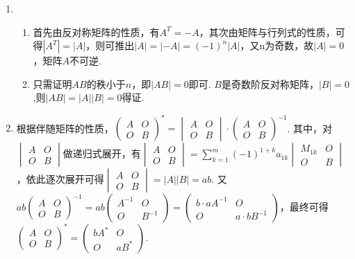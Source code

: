 \begin{enumerate}
    \item \begin{enumerate}
              \item 首先由反对称矩阵的性质，有$A^T=-A$，其次由矩阵与行列式的性质，可得$|A^T|=|A|$，则可推出$|A|=|-A|=(-1)^n|A|$，又n为奇数，故$|A|=0$，矩阵$A$不可逆.

              \item 只需证明$AB$的秩小于$n$，即$|AB|=0$即可. $B$是奇数阶反对称矩阵，$|B|=0$,则$|AB|=|A||B|=0$得证.
          \end{enumerate}

    \item 根据伴随矩阵的性质，$\begin{pmatrix}
                  A & O \\ O & B
              \end{pmatrix}^* = \begin{vmatrix}
                  A & O \\ O & B
              \end{vmatrix} \cdot \begin{pmatrix}
                  A & O \\ O & B
              \end{pmatrix}^{-1}$. 其中，对$\begin{vmatrix}
                  A & O \\ O & B
              \end{vmatrix}$做递归式展开，有$\begin{vmatrix}
                  A & O \\ O & B
              \end{vmatrix}=\displaystyle\sum_{k=1}^{m}(-1)^{1+k}a_{1k}\begin{vmatrix}
                  M_{1k} & O \\ O & B
              \end{vmatrix}$，依此逐次展开可得$\begin{vmatrix}
                  A & O \\ O & B
              \end{vmatrix}=|A||B|=ab$. 又$ab\begin{pmatrix}
                  A & O \\ O & B
              \end{pmatrix}^{-1}=ab\begin{pmatrix}
                  A^{-1} & O \\ O & B^{-1}
              \end{pmatrix}=\begin{pmatrix}
                  b\cdot aA^{-1} & O \\ O & a\cdot bB^{-1}
              \end{pmatrix}$，最终可得$\begin{pmatrix}
                  A & O \\ O & B
              \end{pmatrix}^* = \begin{pmatrix}
                  bA^* & O \\ O & aB^*
              \end{pmatrix}$.


\end{enumerate}
